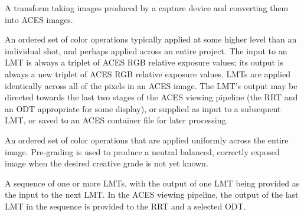 A transform taking images produced by a capture device and converting them into ACES images.

An ordered set of color operations typically applied at some higher level than an individual shot, and perhaps applied across an entire project. The input to an LMT is always a triplet of ACES RGB relative exposure values; its output is always a new triplet of ACES RGB relative exposure values. LMTs are applied identically across all of the pixels in an ACES image. The LMT’s output may be directed towards the last two stages of the ACES viewing pipeline (the RRT and an ODT appropriate for some display), or supplied as input to a subsequent LMT, or saved to an ACES container file for later processing.

An ordered set of color operations that are applied uniformly across the entire image. Pre-grading is used to produce a neutral balanced, correctly exposed image when the desired creative grade is not yet known.

A sequence of one or more LMTs, with the output of one LMT being provided as the input to the next LMT. In the ACES viewing pipeline, the output of the last LMT in the sequence is provided to the RRT and a selected ODT. 